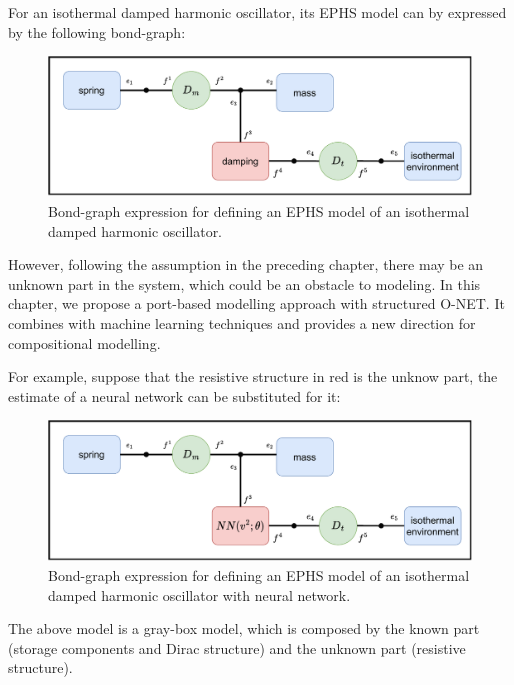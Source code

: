 \documentclass[
	parskip, 			   %
	twoside, 			   %
	DIV=14, 			   %
	BCOR=15.0mm, 		   %
	headsepline, 		   %
	open=right, 		   %
	captions=tableheading, %
	bibliography=totoc,    %
	numbers=noenddot       %
]{scrreprt}
\begin{document}
For an isothermal damped harmonic oscillator, its EPHS model can by expressed by the following bond-graph:

\begin{figure}[h!]
    \centering
    \includegraphics[scale=0.6]{figures/bondgraph_idho_exergetic.pdf}
    \caption{Bond-graph expression for defining an EPHS model of an isothermal damped harmonic oscillator.}
    \label{fig:bondgraph_idho_exergetic}
\end{figure}

However, following the assumption in the preceding chapter, there may be an unknown part in the system, which could be an obstacle to modeling. In this chapter, we propose a port-based modelling approach with structured O-NET. It combines with machine learning techniques and provides a new direction for compositional modelling.

For example, suppose that the resistive structure in red is the unknow part, the estimate of a neural network can be substituted for it:

\clearpage
\begin{figure}[h!]
    \centering
    \includegraphics[scale=0.6]{figures/bondgraph_idho_exergetic_NN.pdf}
    \caption{Bond-graph expression for defining an EPHS model of an isothermal damped harmonic oscillator with neural network.}
    \label{fig:bondgraph_idho_exergetic_NN}
\end{figure}

The above model is a gray-box model, which is composed by the known part (storage components and Dirac structure) and the unknown part (resistive structure).
\end{document}
